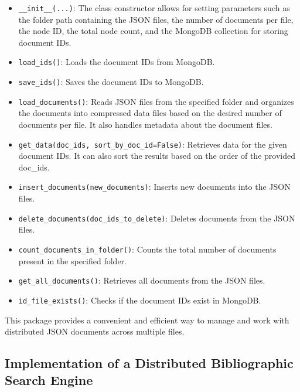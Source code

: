 \documentclass{article}
\begin{document}
\begin{itemize}
    \item \texttt{\_\_init\_\_(...)}: The class constructor allows for setting parameters such 
    as the folder path containing the JSON files, the number of documents per file, the node ID, 
    the total node count, and the MongoDB collection for storing document IDs.
    
    \item \texttt{load\_ids()}: Loads the document IDs from MongoDB.
    
    \item \texttt{save\_ids()}: Saves the document IDs to MongoDB.
    
    \item \texttt{load\_documents()}: Reads JSON files from the specified folder and organizes 
    the documents into compressed data files based on the desired number of documents per file. 
    It also handles metadata about the document files.
    
    \item \texttt{get\_data(doc\_ids, sort\_by\_doc\_id=False)}: Retrieves data for the given 
    document IDs. It can also sort the results based on the order of the provided doc\_ids.
    
    \item \texttt{insert\_documents(new\_documents)}: Inserts new documents into the JSON files.
    
    \item \texttt{delete\_documents(doc\_ids\_to\_delete)}: Deletes documents from the JSON 
    files.
    
    \item \texttt{count\_documents\_in\_folder()}: Counts the total number of documents present 
    in the specified folder.
    
    \item \texttt{get\_all\_documents()}: Retrieves all documents from the JSON files.
    
    \item \texttt{id\_file\_exists()}: Checks if the document IDs exist in MongoDB.
\end{itemize}

This package provides a convenient and efficient way to manage and work with distributed JSON 
documents across multiple files.

\subsection{Implementation of a Distributed Bibliographic Search Engine}
\end{document}
